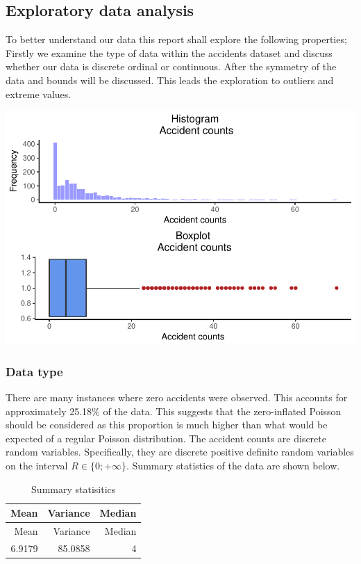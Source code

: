 \documentclass[11pt,preprint, authoryear]{elsarticle}
\numberwithin{equation}{section}
\numberwithin{figure}{section}
\numberwithin{table}{section}
\begin{document}
\subsection{Exploratory data analysis}\label{exploratory-data-analysis}

To better understand our data this report shall explore the following
properties; Firstly we examine the type of data within the accidents
dataset and discuss whether our data is discrete ordinal or continuous.
After the symmetry of the data and bounds will be discussed. This leads
the exploration to outliers and extreme values.

\includegraphics{likelihood_files/figure-latex/unnamed-chunk-1-1.pdf}

\subsubsection{\texorpdfstring{Data type
\label{data_description}}{Data type }}\label{data-type}

There are many instances where zero accidents were observed. This
accounts for approximately 25.18\% of the data. This suggests that the
zero-inflated Poisson should be considered as this proportion is much
higher than what would be expected of a regular Poisson distribution.
The accident counts are discrete random variables. Specifically, they
are discrete positive definite random variables on the interval
\(R \in \{0;+ \infty\}\). Summary statistics of the data are shown
below.

\begin{longtable}[]{@{}rrr@{}}
\caption{Summary statisitics}\tabularnewline
\toprule
Mean & Variance & Median\tabularnewline
\midrule
\endfirsthead
\toprule
Mean & Variance & Median\tabularnewline
\midrule
\endhead
6.9179 & 85.0858 & 4\tabularnewline
\bottomrule
\end{longtable}
\end{document}
